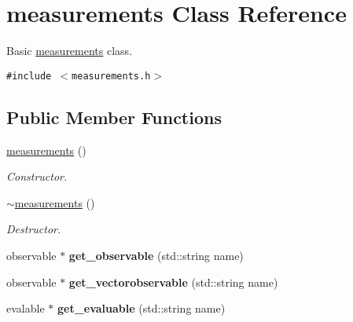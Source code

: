 \hypertarget{classmeasurements}{
\section{measurements Class Reference}
\label{classmeasurements}
}
Basic \hyperlink{classmeasurements}{measurements} class.  


{\tt \#include $<$measurements.h$>$}

\subsection*{Public Member Functions}
\begin{CompactItemize}
\item 
\hypertarget{classmeasurements_8808e688f60a990bd87583bf7ae5f70f}{
\hyperlink{classmeasurements_8808e688f60a990bd87583bf7ae5f70f}{measurements} ()}
\label{classmeasurements_8808e688f60a990bd87583bf7ae5f70f}

\begin{CompactList}\small\item\em Constructor. \item\end{CompactList}\item 
\hypertarget{classmeasurements_c156535b14f2b4cce78ead8117ed3dd7}{
\hyperlink{classmeasurements_c156535b14f2b4cce78ead8117ed3dd7}{$\sim$measurements} ()}
\label{classmeasurements_c156535b14f2b4cce78ead8117ed3dd7}

\begin{CompactList}\small\item\em Destructor. \item\end{CompactList}\item 
\hypertarget{classmeasurements_3b1e8523ede19cf5fd29287b84dcd86d}{
observable $\ast$ \textbf{get\_\-observable} (std::string name)}
\label{classmeasurements_3b1e8523ede19cf5fd29287b84dcd86d}

\item 
\hypertarget{classmeasurements_318a5cf512cc2f778bb5224a33398136}{
observable $\ast$ \textbf{get\_\-vectorobservable} (std::string name)}
\label{classmeasurements_318a5cf512cc2f778bb5224a33398136}

\item 
\hypertarget{classmeasurements_7a64f1db9ef0111565c6f2c2539e350d}{
evalable $\ast$ \textbf{get\_\-evaluable} (std::string name)}
\label{classmeasurements_7a64f1db9ef0111565c6f2c2539e350d}


\end{CompactItemize}
